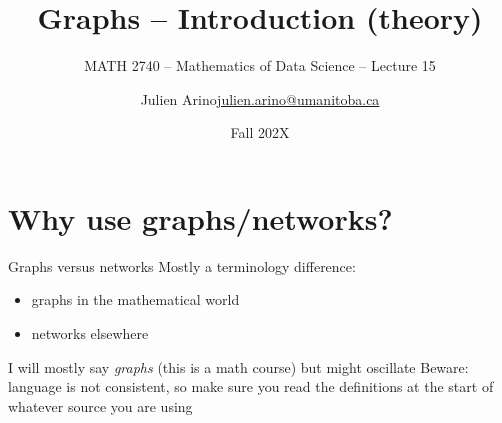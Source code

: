 \documentclass[aspectratio=169]{beamer}\usepackage[]{graphicx}\usepackage[]{xcolor}
\subtitle{MATH 2740 -- Mathematics of Data Science -- Lecture 15}
\author{\texorpdfstring{Julien Arino\newline\url{julien.arino@umanitoba.ca}}{Julien Arino}}
\institute{Department of Mathematics @ University of Manitoba}
\date{Fall 202X}
\title{Graphs -- Introduction (theory)}
\begin{document}


\section{Why use graphs/networks?}


\begin{frame}{Graphs versus networks}
	Mostly a terminology difference:
	\begin{itemize}
	\item graphs in the mathematical world
	\item networks elsewhere
	\end{itemize}
	\vfill
	I will mostly say \emph{graphs} (this is a math course) but might oscillate
	\vfill
	Beware: language is not consistent, so make sure you read the definitions at the start of whatever source you are using
\end{frame}
\end{document}
